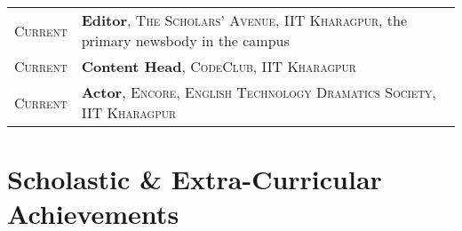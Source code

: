 \documentclass[a4paper,10pt]{extarticle} %
\begin{document}
\begin{tabular}{R{3.0cm}|p{15.0cm}}
\textsc{Current} & \textbf{Editor}, \textsc{The Scholars' Avenue, IIT Kharagpur}, the primary newsbody in the campus\\
\textsc{Current} & \textbf{Content Head}, \textsc{CodeClub, IIT Kharagpur} \\
\textsc{Current} & \textbf{Actor}, \textsc{Encore, English Technology Dramatics Society, IIT Kharagpur} \\
\end{tabular}


\section{Scholastic \& Extra-Curricular Achievements}
\end{document}
